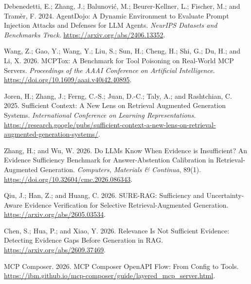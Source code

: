 \documentclass[letterpaper]{article}
\begin{document}
\begin{thebibliography}{}
Debenedetti, E.; Zhang, J.; Balunovi\'c, M.; Beurer-Kellner, L.; Fischer, M.; and Tram\`er, F. 2024.
AgentDojo: A Dynamic Environment to Evaluate Prompt Injection Attacks and Defenses for LLM Agents.
\emph{NeurIPS Datasets and Benchmarks Track}.
\url{https://arxiv.org/abs/2406.13352}.

Wang, Z.; Gao, Y.; Wang, Y.; Liu, S.; Sun, H.; Cheng, H.; Shi, G.; Du, H.; and Li, X. 2026.
MCPTox: A Benchmark for Tool Poisoning on Real-World MCP Servers.
\emph{Proceedings of the AAAI Conference on Artificial Intelligence}.
\url{https://doi.org/10.1609/aaai.v40i42.40895}.

Joren, H.; Zhang, J.; Ferng, C.-S.; Juan, D.-C.; Taly, A.; and Rashtchian, C. 2025.
Sufficient Context: A New Lens on Retrieval Augmented Generation Systems.
\emph{International Conference on Learning Representations}.
\url{https://research.google/pubs/sufficient-context-a-new-lens-on-retrieval-augmented-generation-systems/}.

Zhang, H.; and Wu, W. 2026.
Do LLMs Know When Evidence is Insufficient? An Evidence Sufficiency Benchmark for Answer-Abstention Calibration in Retrieval-Augmented Generation.
\emph{Computers, Materials \& Continua}, 89(1).
\url{https://doi.org/10.32604/cmc.2026.086343}.

Qiu, J.; Han, Z.; and Huang, C. 2026.
SURE-RAG: Sufficiency and Uncertainty-Aware Evidence Verification for Selective Retrieval-Augmented Generation.
\url{https://arxiv.org/abs/2605.03534}.

Chen, S.; Hua, P.; and Xiao, Y. 2026.
Relevance Is Not Sufficient Evidence: Detecting Evidence Gaps Before Generation in RAG.
\url{https://arxiv.org/abs/2609.37469}.

MCP Composer. 2026.
MCP Composer OpenAPI Flow: From Config to Tools.
\url{https://ibm.github.io/mcp-composer/guide/layered_mcp_server.html}.
\end{thebibliography}
\end{document}

